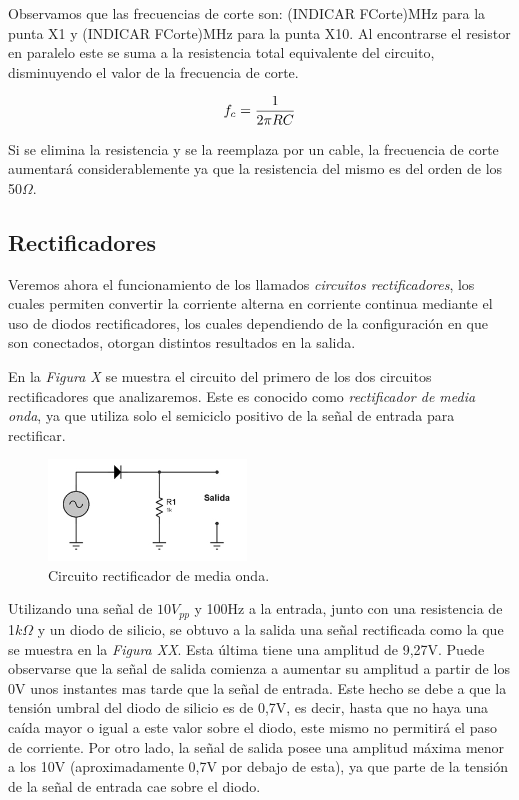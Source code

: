 \documentclass{article}
\begin{document}
				
	Observamos que las frecuencias de corte son: (INDICAR FCorte)MHz para la punta X1 y (INDICAR FCorte)MHz para la punta X10. Al encontrarse el resistor en paralelo este se suma a la resistencia total equivalente del circuito, disminuyendo el valor de la frecuencia de corte.
	
	\begin{equation*}
		f_c = {1 \over 2 \pi RC}
	\end{equation*}
	\medskip
	
	Si se elimina la resistencia y se la reemplaza por un cable, la frecuencia de corte aumentará considerablemente ya que la resistencia del mismo es del orden de los 50$\Omega$.
\bigskip\bigskip\bigskip




\subsection{Rectificadores}
	
	Veremos ahora el funcionamiento de los llamados \textit{circuitos rectificadores}, los cuales permiten convertir la corriente alterna en corriente continua mediante el uso de diodos rectificadores, los cuales dependiendo de la configuración en que son conectados, otorgan distintos resultados en la salida. 
	\par
	En la \textit{Figura X} se muestra el circuito del primero de los dos circuitos rectificadores que analizaremos. Este es conocido como \textit{rectificador de media onda}, ya que utiliza solo el semiciclo positivo de la señal de entrada para rectificar.
\bigskip\bigskip


\begin{figure}[h]
	\centering
	\includegraphics[width=0.47\textwidth]{images/4-4-1-circuito-rectificador-media-onda.jpg}
	\medskip
	\caption{Circuito rectificador de media onda.}
\end{figure}
\bigskip\bigskip


	Utilizando una señal de $10V_{pp}$ y 100Hz a la entrada, junto con una resistencia de 1$k\Omega$ y un diodo de silicio, se obtuvo a la salida una señal rectificada como la que se muestra en la \textit{Figura XX}. Esta última tiene una amplitud de 9,27V. Puede observarse que la señal de salida comienza a aumentar su amplitud a partir de los 0V unos instantes mas tarde que la señal de entrada. Este hecho se debe a que la tensión umbral del diodo de silicio es de 0,7V, es decir, hasta que no haya una caída mayor o igual a este valor sobre el diodo, este mismo no permitirá el paso de corriente. Por otro lado, la señal de salida posee una amplitud máxima menor a los 10V (aproximadamente 0,7V por debajo de esta), ya que parte de la tensión de la señal de entrada cae sobre el diodo.
\bigskip
\end{document}
